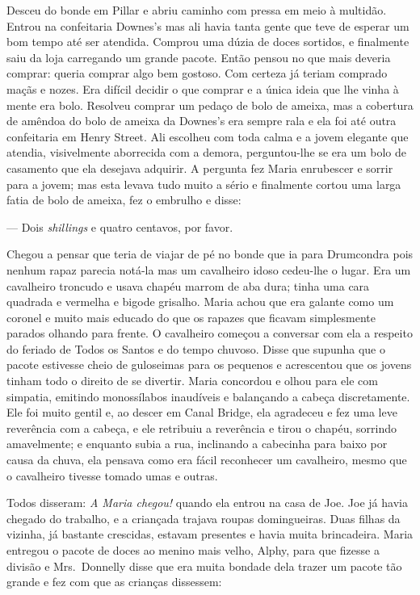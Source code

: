 Desceu do bonde em Pillar e abriu caminho com pressa em meio à multidão.
Entrou na confeitaria Downes’s mas ali havia tanta gente que teve de esperar um
bom tempo até ser atendida.  Comprou uma dúzia de doces sortidos, e finalmente
saiu da loja carregando um grande pacote.  Então pensou no que mais deveria
comprar: queria comprar algo bem gostoso.  Com certeza já teriam comprado maçãs
e nozes.  Era difícil decidir o que comprar e a única ideia que lhe vinha à
mente era bolo.  Resolveu comprar um pedaço de bolo de ameixa, mas a cobertura
de amêndoa do bolo de ameixa da Downes’s era sempre rala e ela foi até outra
confeitaria em Henry Street.  Ali escolheu com toda calma e a jovem elegante
que atendia, visivelmente aborrecida com a demora, perguntou-lhe se era um bolo
de casamento que ela desejava adquirir.  A pergunta fez Maria enrubescer e
sorrir para a jovem; mas esta levava tudo muito a sério e finalmente cortou uma
larga fatia de bolo de ameixa, fez o embrulho e disse:

--- Dois \textit{shillings} e quatro centavos, por favor.

Chegou a pensar que teria de viajar de pé no bonde que ia para Drumcondra pois
nenhum rapaz parecia notá-la mas um cavalheiro idoso cedeu-lhe o lugar.  Era um
cavalheiro troncudo e usava chapéu marrom de aba dura; tinha uma cara quadrada
e vermelha e bigode grisalho.  Maria achou que era galante como um coronel e
muito mais educado do que os rapazes que ficavam simplesmente parados olhando
para frente.  O cavalheiro começou a conversar com ela a respeito do feriado de
Todos os Santos e do tempo chuvoso.  Disse que supunha que o pacote estivesse
cheio de guloseimas para os pequenos e acrescentou que os jovens tinham todo o
direito de se divertir.  Maria concordou e olhou para ele com simpatia,
emitindo monossílabos inaudíveis e balançando a cabeça discretamente.  Ele foi
muito gentil e, ao descer em Canal Bridge, ela agradeceu e fez uma leve
reverência com a cabeça, e ele retribuiu a reverência e tirou o chapéu,
sorrindo amavelmente; e enquanto subia a rua, inclinando a cabecinha para baixo
por causa da chuva, ela pensava como era fácil reconhecer um cavalheiro, mesmo
que o cavalheiro tivesse tomado umas e outras.

Todos disseram: \textit{A Maria chegou!} quando ela entrou na casa de Joe.  Joe
já havia chegado do trabalho, e a criançada trajava roupas domingueiras.  Duas
filhas da vizinha, já bastante crescidas, estavam presentes e havia muita
brincadeira.  Maria entregou o pacote de doces ao menino mais velho, Alphy,
para que fizesse a divisão e Mrs.~Donnelly disse que era muita bondade dela
trazer um pacote tão grande e fez com que as crianças dissessem:


